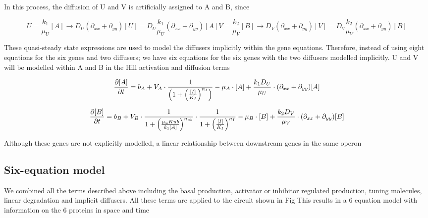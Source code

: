 In this process, the diffusion of U and V is artificially assigned to A and B, since

\begin{subequations}\label{[diffuser_artificial]}

\begin{equation}
    U = \frac{k_{1}}{\mu_{U}}[A] \longrightarrow D_{U} (\partial_{xx} + \partial_{yy})[U] = D_{U}\frac{k_{1}}{\mu_{U}}  (\partial_{xx} + \partial_{yy}) [A]\label{eq:equation2}
\end{equation}

\begin{equation}
    V = \frac{k_{2}}{\mu_{V}}[B] \longrightarrow D_{V} (\partial_{xx} + \partial_{yy})[V] =  D_{V}\frac{k_{2}}{\mu_{V}}  (\partial_{xx} + \partial_{yy}) [B]\label{eq:equation}
\end{equation}

\end{subequations}

These quasi-steady state expressions are used to model the diffusers implicitly within the gene equations.
Therefore, instead of using eight equations for the six genes and two diffusers; we have six equations for the six genes with the two diffusers modelled implicitly.
U and V will be modelled within A and B in the Hill activation and diffusion terms

\begin{equation}
    \pdv{[A]}{t} = b_{A}+V_{A}\cdot \frac{1}{\left(1+\left(\frac{[I]}{K_{I}}\right)^{n_{I}}\right)}-\mu_{A}\cdot[A] + \frac{k_{1}D_{U}}{\mu_{U}}\cdot (\partial_{xx} + \partial_{yy})[A]
\end{equation}

\begin{equation}
    \pdv{[B]}{t} = b_{B}+V_{B}\cdot\frac{1}{1+\left(\frac{\mu_{u}K{ub}}{k_{1}[A]}\right)^{n_{ab}}}\cdot\frac{1}{1+\left(\frac{[I]}{K_{I}}\right)^{n_{I}}}-\mu_{B}\cdot[B] + \frac{k_{2}D_{V}}{\mu_{V}}\cdot (\partial_{xx} + \partial_{yy})[B]
\end{equation}

Although these genes are not explicitly modelled, a linear relationship between downstream genes in the same operon
\subsection{Six-equation model}
We combined all the terms described above including the basal production, activator or inhibitor regulated production, tuning molecules, linear degradation and implicit diffusers.
All these terms are applied to the circuit shown in Fig %
This results in a 6 equation model with information on the 6 proteins in space and time

